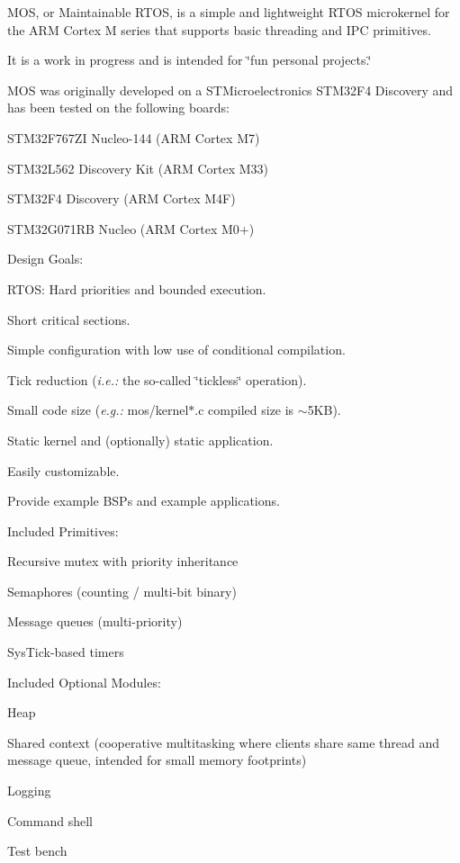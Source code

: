 M\+OS, or Maintainable R\+T\+OS, is a simple and lightweight R\+T\+OS microkernel for the A\+RM Cortex M series that supports basic threading and I\+PC primitives.

It is a work in progress and is intended for \char`\"{}fun personal projects.\char`\"{}

M\+OS was originally developed on a S\+T\+Microelectronics S\+T\+M32\+F4 Discovery and has been tested on the following boards\+:
\begin{DoxyItemize}
\item S\+T\+M32\+F767\+ZI Nucleo-\/144 (A\+RM Cortex M7)
\item S\+T\+M32\+L562 Discovery Kit (A\+RM Cortex M33)
\item S\+T\+M32\+F4 Discovery (A\+RM Cortex M4F)
\item S\+T\+M32\+G071\+RB Nucleo (A\+RM Cortex M0+)
\end{DoxyItemize}

Design Goals\+:
\begin{DoxyItemize}
\item R\+T\+OS\+: Hard priorities and bounded execution.
\item Short critical sections.
\item Simple configuration with low use of conditional compilation.
\item Tick reduction ({\itshape i.\+e.\+:} the so-\/called \char`\"{}tickless\char`\"{} operation).
\item Small code size ({\itshape e.\+g.\+:} mos/kernel$\ast$.c compiled size is $\sim$5\+KB).
\item Static kernel and (optionally) static application.
\item Easily customizable.
\item Provide example B\+S\+Ps and example applications.
\end{DoxyItemize}

Included Primitives\+:
\begin{DoxyItemize}
\item Recursive mutex with priority inheritance
\item Semaphores (counting / multi-\/bit binary)
\item Message queues (multi-\/priority)
\item Sys\+Tick-\/based timers
\end{DoxyItemize}

Included Optional Modules\+:
\begin{DoxyItemize}
\item Heap
\item Shared context (cooperative multitasking where clients share same thread and message queue, intended for small memory footprints)
\item Logging
\item Command shell
\item Test bench
\end{DoxyItemize}

